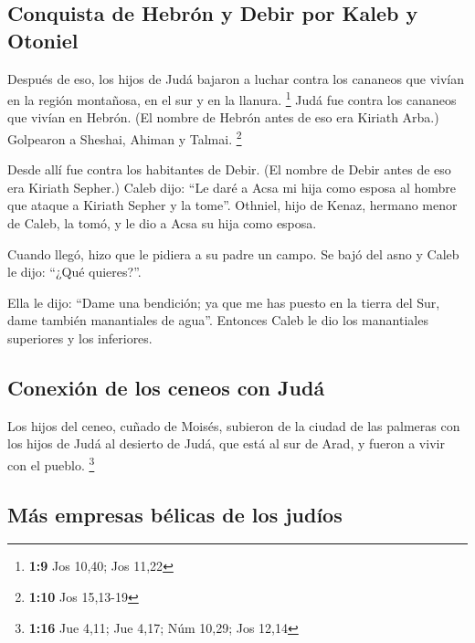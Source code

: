 \begin{paracol}{2}
{\subsection{Conquista de Hebrón y Debir por Kaleb y
Otoniel}\label{conquista-de-hebruxf3n-y-debir-por-kaleb-y-otoniel}}

 Después de eso, los hijos de Judá bajaron a luchar contra
los cananeos que vivían en la región montañosa, en el sur y en la
llanura. \footnote{\textbf{1:9} Jos 10,40; Jos 11,22} 
Judá fue contra los cananeos que vivían en Hebrón. (El nombre de Hebrón
antes de eso era Kiriath Arba.) Golpearon a Sheshai, Ahiman y Talmai.
\footnote{\textbf{1:10} Jos 15,13-19}

 Desde allí fue contra los habitantes de Debir. (El
nombre de Debir antes de eso era Kiriath Sepher.)  Caleb
dijo: ``Le daré a Acsa mi hija como esposa al hombre que ataque a
Kiriath Sepher y la tome''.  Othniel, hijo de Kenaz,
hermano menor de Caleb, la tomó, y le dio a Acsa su hija como esposa.

 Cuando llegó, hizo que le pidiera a su padre un campo.
Se bajó del asno y Caleb le dijo: ``¿Qué quieres?''.

 Ella le dijo: ``Dame una bendición; ya que me has puesto
en la tierra del Sur, dame también manantiales de agua''. Entonces Caleb
le dio los manantiales superiores y los inferiores.

\hypertarget{conexiuxf3n-de-los-ceneos-con-juduxe1}{%
\subsection{Conexión de los ceneos con
Judá}\label{conexiuxf3n-de-los-ceneos-con-juduxe1}}

 Los hijos del ceneo, cuñado de Moisés, subieron de la
ciudad de las palmeras con los hijos de Judá al desierto de Judá, que
está al sur de Arad, y fueron a vivir con el pueblo. \footnote{\textbf{1:16}
  Jue 4,11; Jue 4,17; Núm 10,29; Jos 12,14}

\hypertarget{muxe1s-empresas-buxe9licas-de-los-juduxedos}{%
\subsection{Más empresas bélicas de los
judíos}\label{muxe1s-empresas-buxe9licas-de-los-juduxedos}}


\end{paracol}
